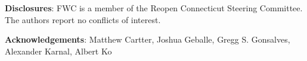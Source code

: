 \documentclass[11pt]{article}
\begin{document}

\textbf{Disclosures}: FWC is a member of the Reopen Connecticut Steering Committee.  The authors report no conflicts of interest. 



\textbf{Acknowledgements}:
Matthew Cartter,
Joshua Geballe,
Gregg S. Gonsalves,
Alexander Karnal,
Albert Ko 






\end{document}
